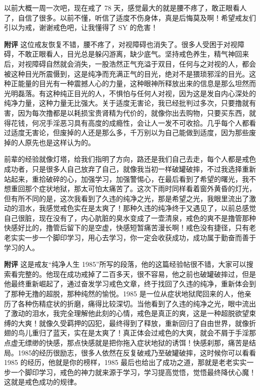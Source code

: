 \begin{case}
    以前大概一周一次吧，现在戒了 78 天，感觉最大的就是腰不疼了，敢正眼看人了，自信了很多。以前不懂，听信了适度不伤身体，真是后悔莫及啊！希望戒友们引以为戒，谢谢戒色吧，让我懂得了 SY 的危害！

    \textbf{附评} 这位戒友恢复不错，腰不疼了，对视障碍也消失了。很多人受困于对视障碍，不敢正眼看人，目光总是躲闪游离，缺少底气。坚持戒色养生，精气神回来后，对视障碍自然就会消失，一股浩然正气充溢于双目，任何与之对视的人，都会被这种目光所震慑到，这是纯净而充满正气的目光，绝对不是猥琐邪淫的目光。这种正能量的目光有一种震撼人心的力量，这种眼神所释放出来的信息是那么坦然而光明磊落。有这种纯正目光的人，不惧怕与任何人对视，因为这是发自内心深处的纯净力量，这种力量无比强大。关于适度无害论，我已经批判过多次，只要撸就有害，因为每次撸都是以耗损宝贵肾精为代价的，就像你出去购物，只要买东西，就得花钱，何况手淫恶习具有高度的成瘾性，会让人一发不可收拾。几乎每个人都看过适度无害论，但废掉的人还是那么多，千万别以为自己能做到适度，因为那些废掉的人原先也是这样认为的。
\end{case}

\begin{case}
    前辈的经验就像灯塔，给我们指明了方向，路还是我们自己去走，每个人都是戒色成功者，只是很多人自己放弃了自己，就像我当初一样破罐破摔，不过我选择重新站起来，重拾破碎的心，加强学习，加强警惕心，在最后看到了希望的曙光，我不想重回那个症状地狱，那太可怕太痛苦了。这次下雨时同样看着窗外黄昏的灯光，但有所不同的是，这次我看到了久违的纯净之光，那是希望之光，我眼里流出了激动的泪水，我感觉戒色实在是太爽了！那种久违的纯净终于又遇见了，以前总感觉自己很脏，现在没有了，内心肮脏的臭水变成了一壶清泉，戒色的爽不是撸管那种快感好比的，撸管后留下的是空虚，快感短暂痛苦漫长啊！戒色没有捷径，只有老老实实一步一个脚印学习，用心去学习，你一定会收获成功，成功属于勤奋而善于学习的人。

    \textbf{附评} 这是戒友“纯净人生 1985”所写的段落，他的这篇经验帖很不错，大家可以搜索看完整的。他现在成功戒掉了二百多天，很不容易，他之前也破罐破摔过，但是他最终重新崛起了，通过奋发学习戒色文章，终于找回了久违的纯净，重新体会到了那种无撸的超脱，那种纯然的愉悦。1985 是一位从症状地狱爬回来的人，他亲历了各种伤精症状的折磨，痛得比较深切。当他看到了久违的纯净之光，眼中流出了激动的泪水，我完全理解他此刻的心情，戒色是真正的爽，这是一种超脱欲望束缚的大爽！就像久受羁押的囚犯，最终得到了释放，重新回归了自由世界，就像折翅的鸟儿重归了蓝天，实在是太爽了！真正体会过戒色的大爽，就会不屑于手淫那点虚无缥缈的快感，那点快感就是把你拖入症状地狱的诱饵！快感刹那，痛苦是结局。1985的经历很励志，很多人依然在反复破戒乃至破罐破摔，这时候你可以看看 1985 的经历，他就是你的榜样，1985 最后也给出了成功之道，那就是老老实实一步一个脚印学习，戒色的神力就来源于学习，学习提高觉悟，觉悟最终降伏心魔！这就是戒色成功的规律。
\end{case}

